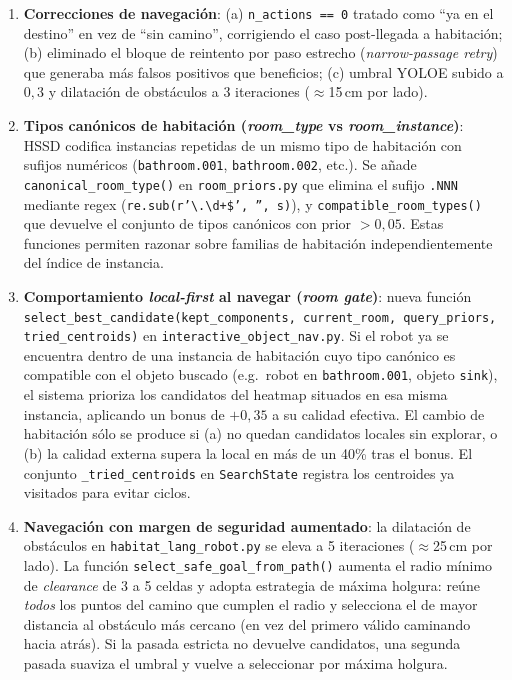 \begin{enumerate}
  \item \textbf{Correcciones de navegación}: (a) \texttt{n\_actions == 0} tratado
        como ``ya en el destino'' en vez de ``sin camino'', corrigiendo el caso
        post-llegada a habitación; (b) eliminado el bloque de reintento por paso
        estrecho (\textit{narrow-passage retry}) que generaba más falsos positivos
        que beneficios; (c) umbral YOLOE subido a $0{,}3$ y dilatación de obstáculos
        a 3 iteraciones ($\approx$15\,cm por lado).

  \item \textbf{Tipos canónicos de habitación (\textit{room\_type} vs
        \textit{room\_instance})}: HSSD codifica instancias repetidas de un mismo
        tipo de habitación con sufijos numéricos (\texttt{bathroom.001},
        \texttt{bathroom.002}, etc.). Se añade \texttt{canonical\_room\_type()} en
        \texttt{room\_priors.py} que elimina el sufijo \texttt{.NNN} mediante regex
        (\texttt{re.sub(r'\textbackslash.\textbackslash d+\$', '', s)}), y
        \texttt{compatible\_room\_types()} que devuelve el conjunto de tipos
        canónicos con prior $>0{,}05$. Estas funciones permiten razonar sobre
        familias de habitación independientemente del índice de instancia.

  \item \textbf{Comportamiento \textit{local-first} al navegar (\textit{room gate})}:
        nueva función \texttt{select\_best\_candidate(kept\_components, current\_room,
        query\_priors, tried\_centroids)} en \texttt{interactive\_object\_nav.py}. Si
        el robot ya se encuentra dentro de una instancia de habitación cuyo tipo
        canónico es compatible con el objeto buscado (e.g.\ robot en
        \texttt{bathroom.001}, objeto \texttt{sink}), el sistema prioriza los
        candidatos del heatmap situados en esa misma instancia, aplicando un bonus de
        $+0{,}35$ a su calidad efectiva. El cambio de habitación sólo se produce si
        (a) no quedan candidatos locales sin explorar, o (b) la calidad externa supera
        la local en más de un 40\% tras el bonus. El conjunto
        \texttt{\_tried\_centroids} en \texttt{SearchState} registra los centroides ya
        visitados para evitar ciclos.

  \item \textbf{Navegación con margen de seguridad aumentado}: la dilatación de
        obstáculos en \texttt{habitat\_lang\_robot.py} se eleva a 5 iteraciones
        ($\approx$25\,cm por lado). La función
        \texttt{select\_safe\_goal\_from\_path()} aumenta el radio mínimo de
        \textit{clearance} de 3 a 5 celdas y adopta estrategia de máxima holgura:
        reúne \emph{todos} los puntos del camino que cumplen el radio y selecciona el
        de mayor distancia al obstáculo más cercano (en vez del primero válido caminando
        hacia atrás). Si la pasada estricta no devuelve candidatos, una segunda pasada
        suaviza el umbral y vuelve a seleccionar por máxima holgura.


\end{enumerate}

